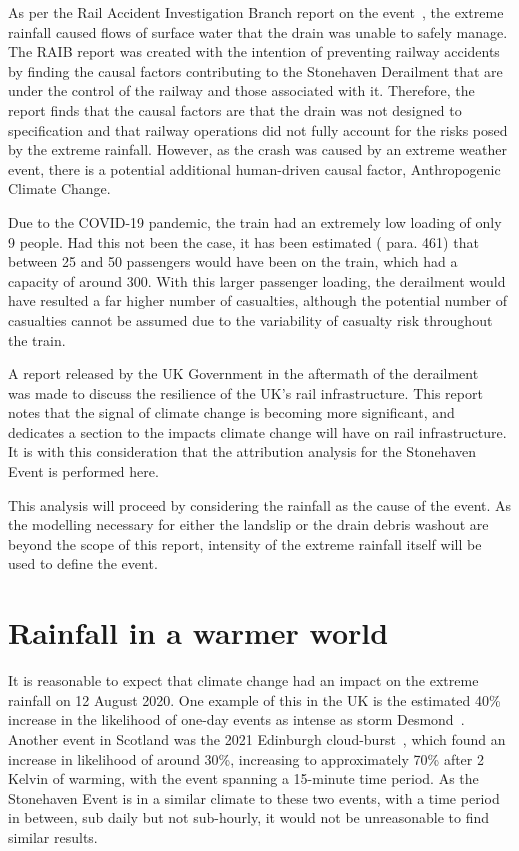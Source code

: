 \documentclass[12pt,a4paper,openany]{report}
\begin{document}
As per the Rail Accident Investigation Branch report on the event~\cite{RAIB_2022},
    the extreme rainfall caused flows of surface water that the drain was unable to safely manage.
The RAIB report was created with the intention of preventing railway accidents by finding the causal
    factors contributing to the Stonehaven Derailment that are under the control of the railway
    and those associated with it.
Therefore,
    the report finds that the causal factors are that the drain was not designed to specification
    and that railway operations did not fully account for the risks posed by the extreme rainfall.
However,
    as the crash was caused by an extreme weather event,
    there is a potential additional human-driven causal factor, Anthropogenic Climate Change.

Due to the COVID-19 pandemic,
    the train had an extremely low loading of only 9 people.
Had this not been the case,
    it has been estimated (\cite{RAIB_2022} para. 461) that between 25 and 50 passengers would have been on the train,
    which had a capacity of around 300.
With this larger passenger loading,
    the derailment would have resulted a far higher number of casualties,
    although the potential number of casualties cannot be assumed due to the variability of casualty risk throughout the train.

A report released by the UK Government in the aftermath of the derailment~\cite{NR_DfT_2021}
    was made to discuss the resilience of the UK's rail infrastructure.
This report notes that the signal of climate change is becoming more significant,
    and dedicates a section to the impacts climate change will have on rail infrastructure.
It is with this consideration that the attribution analysis for the Stonehaven Event is performed here.

This analysis will proceed by considering the rainfall as the cause of the event.
As the modelling necessary for either the landslip or the drain debris washout are beyond the scope of this report,
    intensity of the extreme rainfall itself will be used to define the event.

\section{Rainfall in a warmer world}\label{sec:warmerrainfall}

It is reasonable to expect that climate change had an impact on the extreme rainfall on 12 August 2020.
One example of this in the UK is the estimated 40\% increase
    in the likelihood of one-day events as intense as storm Desmond~\cite{Desmond_2015}.
Another event in Scotland was the 2021 Edinburgh cloud-burst~\cite{Tett_Soon},
    which found an increase in likelihood of around 30\%,
    increasing to approximately 70\% after 2 Kelvin of warming,
    with the event spanning a 15-minute time period.
As the Stonehaven Event is in a similar climate to these two events,
    with a time period in between,
    sub daily but not sub-hourly,
    it would not be unreasonable to find similar results.
\end{document}
